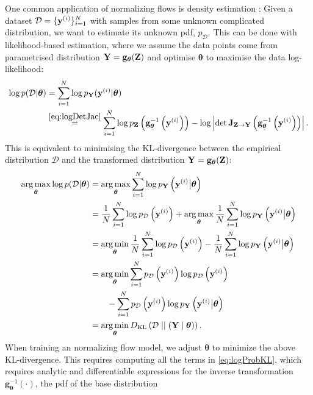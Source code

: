 \documentclass{statsmsc}
\begin{document}
One common application of normalizing flows is density estimation \citep{normalizing_flows};
Given a dataset $\mathcal{D}=\{\mathbf{y}^{(i)}\}_{i=1}^N$ with samples from some
unknown complicated distribution, we want to estimate its unknown \ac{pdf}, $p_{\mathcal{D}}$.
This can be done with likelihood-based estimation, where we assume the data points come from
parametrised distribution $\mathbf{Y}=\mathbf{g}_{\bm \theta}(\mathbf{Z})$ and optimise $\bm\theta$ to maximise
the data log-likelihood:
\begin{align}
    \log p(\mathcal{D}| \bm\theta)
    & = \sum_{i=1}^N \log p_\bfY(\bfy^{(i)}| \bm\theta ) \\
    &\stackrel{\cref{eq:logDetJac}}{=} \sum^{N}_{i=1}
    \log p_\bfZ\left(\mathbf{g}_{\bm\theta}^{-1}\left(\bfy^{(i)}\right)\right) - \log \left|\det \mathbf{J}_{\bfZ \rightarrow {\bfY}}\left(\mathbf{g}_{\bm\theta}^{-1}\left(\bfy^{(i)}\right)\right) \right|. \label{eq:logProbKL}
\end{align}
This is equivalent to minimising the \ac{KL-divergence} between the empirical distribution
$\mathcal{D}$ and the transformed distribution $\mathbf{Y}=\mathbf{g}_{\bm\theta}(\mathbf{Z})$:
\begin{align}
    \operatorname*{arg\,max}_{\bm\theta} \log p(\mathcal{D}| \bm\theta)
    &= \operatorname*{arg\,max}_{\bm\theta}\sum_{i=1}^N \log p_{\mathbf{Y}} \left(\mathbf{y}^{(i)}\big|\bm\theta \right) \\
    &=\frac{1}{N}  \sum_{i=1}^N \log p_{\mathcal{D}}\left(\mathbf{y}^{(i)}\right)
        +\operatorname*{arg\,max}_{\bm\theta}\frac{1}{N} \sum_{i=1}^N \log p_{\mathbf{Y}} \left(\mathbf{y}^{(i)}\big|\bm\theta \right) \\
    &= \operatorname*{arg\,min}_{\bm\theta}\frac{1}{N}  \sum_{i=1}^N \log p_{\mathcal{D}}\left(\mathbf{y}^{(i)}\right)
    -\frac{1}{N} \sum_{i=1}^N \log p_{\mathbf{Y}} \left(\mathbf{y}^{(i)}\big|\bm\theta \right) \\
    &= \operatorname*{arg\,min}_{\bm\theta}\sum^{N}_{i=1}  p_\mathcal{D}\left(\mathbf{y}^{(i)}\right)  \log p_{\mathcal{D}}\left(\mathbf{y}^{(i)}\right) \\
    &\qquad- \sum_{i=1}^N  p_\mathcal{D}\left(\mathbf{y}^{(i)}\right) \log p_{\mathbf{Y}} \left(\mathbf{y}^{(i)}\big|\bm\theta \right) \\
    &= \operatorname*{arg\,min}_{\bm\theta} D_{\textrm{KL}}\left(\mathcal{D}\;||\; (\mathbf{Y}\mid\bm\theta)\right).
\end{align}
When training an normalizing flow model, we adjust $\bm\theta$ to minimize the
above \ac{KL-divergence}. This requires computing all the terms in \cref{eq:logProbKL}, which
requires analytic and differentiable expressions for the inverse transformation
$\mathbf{g}_{\bm\theta}^{-1}\left(\cdot \right)$, the \ac{pdf} of the base distribution
\end{document}
